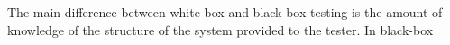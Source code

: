 The main difference between white-box and black-box testing is the amount of knowledge of the structure of the system provided to the tester. In black-box 
